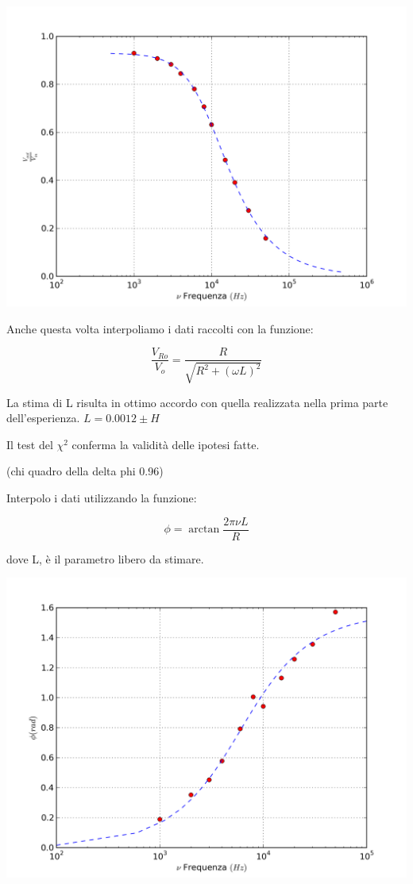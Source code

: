 \begin{center}
 \includegraphics[scale=0.70]{grafici/C3/ddpindu.png}
\end{center}

Anche questa volta interpoliamo i dati raccolti con la funzione:

$$\frac{V_{Ro}}{V_o} = \frac{R}{\sqrt{R^2+(\omega L)^2}}$$

La stima di L risulta in ottimo accordo con quella realizzata nella prima parte dell'esperienza.
$L=0.0012 \pm H $

Il test del $\chi^2$ conferma la validità delle ipotesi fatte.

(chi quadro della delta phi 0.96)


Interpolo i dati utilizzando la funzione:

$$ \phi = \arctan \frac{2\pi\nu L}{R} $$

dove L, è il parametro libero da stimare.


\begin{center}
 \includegraphics[scale=0.70]{grafici/C3/faseindu.png}
\end{center}

